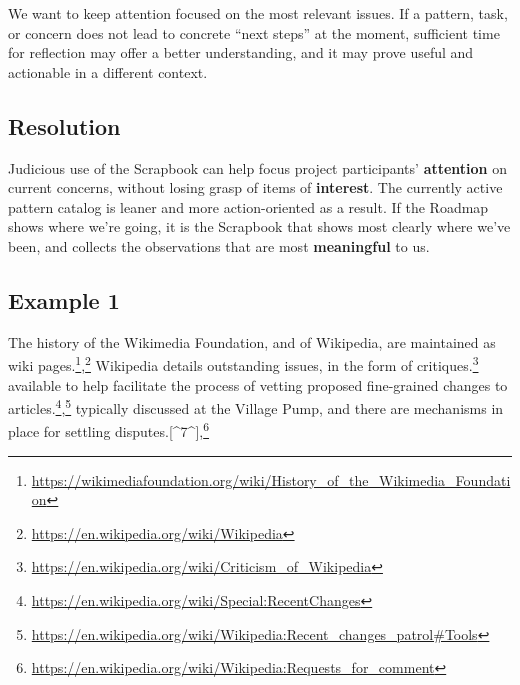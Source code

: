 We want to keep attention focused on the most relevant issues. If a
pattern, task, or concern does not lead to concrete ``next steps'' at
the moment, sufficient time for reflection may offer a better
understanding, and it may prove useful and actionable in a different
context.

\hypertarget{resolution}{%
\subsection{Resolution}\label{resolution}}

Judicious use of the {{Scrapbook}} can help focus project participants'
\textbf{attention} on current concerns, without losing grasp of items of
\textbf{interest}. The currently active pattern catalog is leaner and
more action-oriented as a result. If the {{Roadmap}} shows where we're
going, it is the {{Scrapbook}} that shows most clearly where we've been,
and collects the observations that are most \textbf{meaningful} to us.

\hypertarget{example-1}{%
\subsection{Example 1}\label{example-1}}

The history of the Wikimedia Foundation, and of Wikipedia, are
maintained as wiki pages.\footnote{\url{https://wikimediafoundation.org/wiki/History_of_the_Wikimedia_Foundation}},\footnote{\url{https://en.wikipedia.org/wiki/Wikipedia}}
Wikipedia details outstanding issues, in the form of
critiques.\footnote{\url{https://en.wikipedia.org/wiki/Criticism_of_Wikipedia}}
available to help facilitate the process of vetting proposed
fine-grained changes to articles.\footnote{\url{https://en.wikipedia.org/wiki/Special:RecentChanges}},\footnote{\url{https://en.wikipedia.org/wiki/Wikipedia:Recent_changes_patrol\#Tools}}
typically discussed at the Village Pump, and there are mechanisms in
place for settling disputes.{[}\^{}7\^{}{]},\footnote{\url{https://en.wikipedia.org/wiki/Wikipedia:Requests_for_comment}}


